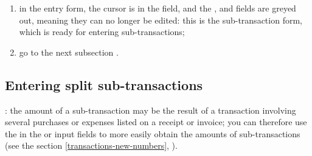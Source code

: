 \begin{enumerate}
	\item in the entry form, the cursor is in the  field, and the ,  and  fields are greyed out, meaning they can no longer be edited: this is the sub-transaction form, which is ready for entering sub-transactions;
	\item go to the next subsection .
\end{enumerate}


\subsection{Entering split sub-transactions\label{transactions-breakdown-slave}}

\Note{}: the amount of a sub-transaction may be the result of a transaction involving several purchases or expenses listed on a receipt or invoice; you can therefore use the  in the  or  input fields to more easily obtain the amounts of sub-transactions (see the section \vref{transactions-new-numbers}, ).

